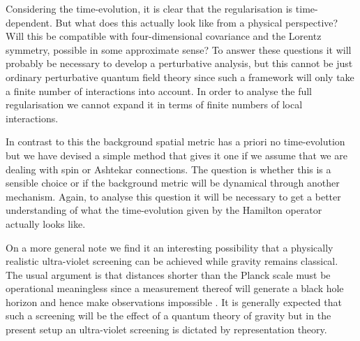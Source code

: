 \documentclass[letterpaper,11pt]{article}
\begin{document}
Considering the time-evolution, it is clear that the regularisation is time-dependent. But what does this actually look like from a physical perspective? Will this be compatible with four-dimensional covariance and the Lorentz symmetry, possible in some approximate sense? To answer these questions it will probably be necessary to develop a perturbative analysis, but this cannot be just ordinary perturbative quantum field theory since such a framework will only take a finite number of interactions into account. In order to analyse the full regularisation we cannot expand it in terms of finite numbers of local interactions.

In contrast to this the background spatial metric has a priori no time-evolution but we have devised a simple method that gives it one if we assume that we are dealing with spin or Ashtekar connections. The question is whether this is a sensible choice or if the background metric will be dynamical through another mechanism. Again, to analyse this question it will be necessary to get a better understanding of what the time-evolution given by the Hamilton operator actually looks like. 





On a more general note we find it an interesting possibility that a physically realistic ultra-violet screening can be achieved while gravity remains classical. The usual argument is that distances shorter than the Planck scale must be operational meaningless since a measurement thereof will generate a black hole horizon and hence make observations impossible \cite{Doplicher:1994tu}. It is generally expected that such a screening will be the effect of a quantum theory of gravity but in the present setup an ultra-violet screening is dictated by representation theory.  
\end{document}
